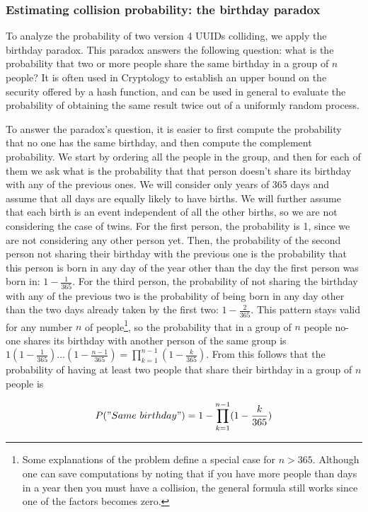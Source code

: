 \documentclass{report}
\begin{document}
\subsubsection{Estimating collision probability: the birthday paradox}
To analyze the probability of two version 4 UUIDs colliding, we apply the birthday paradox. 
This paradox answers the following question: what is the probability that two or more people share the same birthday in a group of $n$ people? It is often used in Cryptology to
establish an upper bound on the security offered by a hash function, and can be used in general to evaluate the probability of obtaining the same result twice out of a uniformly random
process. \par
To answer the paradox's question, it is easier to first compute the probability that no one has the same birthday, and then compute the complement probability. We start by ordering all 
the people in the group, and then for each of them we ask what is the probability that that person doesn't share its birthday with any of the previous ones. We will consider only years
of 365 days and assume that all days are equally likely to have births. We will further assume that each birth is an event independent of all the other births, so we are not
considering the case of twins. For the first person, the
probability is 1, since we are not considering any other person yet. Then, the probability of the second person not sharing their birthday with the previous one is the probability
that this person is born in any day of the year other than the day the first person was born in: $1-\frac{1}{365}$. For the third person, the probability of not sharing the
birthday with any of the previous two is the probability of being born in any day other than the two days already taken by the first two: $1-\frac{2}{365}$. This pattern stays
valid for any number $n$ of people\footnote{Some explanations of the problem define a special case for $n>365$. Although one can save computations by noting that if you have more
people than days in a year then you must have a collision, the general formula still works since one of the factors becomes zero.}, so the probability that in a group of $n$ people no-one shares its birthday with another person of the same group is $1(1 - \frac{1}{365} ) \dotso  (1 - \frac{n - 1}{365} ) = \prod_{k=1}^{n-1}(1-\frac{k}{365})$. From this follows that 
the probability of having at least two people that share their birthday in a group of $n$ people is

$$P("Same\ birthday")=1-\prod_{k=1}^{n-1}(1-\frac{k}{365})$$
\end{document}
